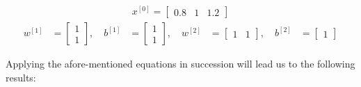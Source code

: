 \documentclass[12pt]{article}
\begin{document}
\begin{enumerate}[leftmargin=\labelsep]
        \begin{equation*}
          \begin{aligned}
            x^{[0]} = \begin{bmatrix}
              0.8 & 1 & 1.2
            \end{bmatrix}
          \end{aligned}
        \end{equation*}
        \begin{equation*}
          \begin{aligned}
            w^{[1]} & = \begin{bmatrix}
                          1 \\
                          1
                        \end{bmatrix}, \quad
            b^{[1]} & = \begin{bmatrix}
                          1 \\
                          1
                        \end{bmatrix}, \quad
            w^{[2]} & = \begin{bmatrix}
                          1 & 1
                        \end{bmatrix}, \quad
            b^{[2]} & = \begin{bmatrix}
                          1
                        \end{bmatrix}
          \end{aligned}
        \end{equation*}

        \pagebreak

        Applying the afore-mentioned equations in succession will lead us to the following results:



\end{enumerate}
\end{document}
